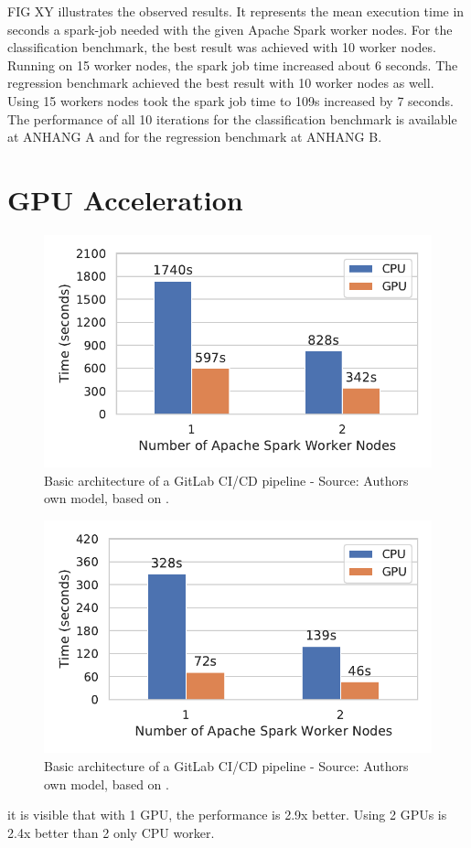 FIG XY illustrates the observed results. It represents the mean execution time in seconds a spark-job needed with the given Apache Spark worker nodes.
For the classification benchmark, the best result was achieved with 10 worker nodes. Running on 15 worker nodes, the spark job time increased about 6 seconds.
The regression benchmark achieved the best result with 10 worker nodes as well. Using 15 workers nodes took the spark job time to 109s increased by 7 seconds.
The performance of all 10 iterations for the classification benchmark is available at ANHANG A and for the regression benchmark at ANHANG B.


\section{GPU Acceleration}
\begin{figure}[h]
\centering
\includegraphics[scale=1]{images/07_evaluation/mortgage/mortgage_gpu_vs_cpu}
\caption{Basic architecture of a GitLab CI/CD pipeline - Source: Authors own model, based on \cite{Gitlab2020Docs}.}
\label{fig:07_mortgage_static-gpu_results}
\end{figure}
\begin{figure}[h]
\centering
\includegraphics[scale=1]{images/07_evaluation/taxi/taxi_gpu_vs_cpu}
\caption{Basic architecture of a GitLab CI/CD pipeline - Source: Authors own model, based on \cite{Gitlab2020Docs}.}
\label{fig:07_taxi_static-gpu_results}
\end{figure}
it is visible that with 1 GPU, the performance is 2.9x better. Using 2 GPUs is 2.4x better than 2 only CPU worker.


